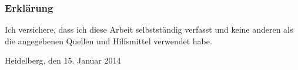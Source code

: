
\subsubsection*{Erklärung}
\label{sub:Erklärung}

Ich versichere, dass ich diese Arbeit selbstständig verfasst und keine 
anderen als die angegebenen Quellen und Hilfsmittel verwendet habe.

\vspace{2\baselineskip}

Heidelberg, den 15. Januar 2014 \hspace{5em} \hrulefill

